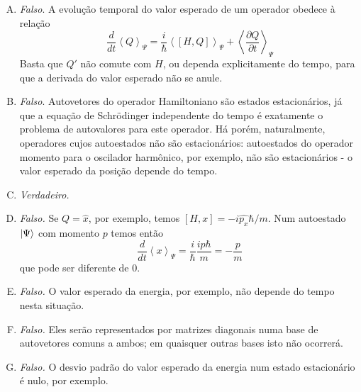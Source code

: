 \documentclass[a4paper, 12pt, notitlepage]{article}
\begin{document}
\begin{enumerate}
\begin{enumerate}[(A)]
  \item \textit{Falso}. A evolução temporal do valor esperado de um operador obedece à relação
  \[ \frac{d}{dt} \left\langle Q \right\rangle_\Psi = \frac{i}{\hbar}\left\langle [H, Q]\right\rangle_\Psi + \left\langle \frac{\partial Q}{\partial t}\right\rangle_\Psi\]
  Basta que $Q'$ não comute com $H$, ou dependa explicitamente do tempo, para que a derivada do valor esperado não se anule.
  \item \textit{Falso}. Autovetores do operador Hamiltoniano são estados estacionários, já que a equação de Schrödinger independente do tempo é exatamente o problema de autovalores para este operador. Há porém, naturalmente, operadores cujos autoestados não são estacionários: autoestados do operador momento para o oscilador harmônico, por exemplo, não são estacionários - o valor esperado da posição depende do tempo.
  \item \textit{Verdadeiro.}
  \item \textit{Falso.} Se $Q = \hat{x}$, por exemplo, temos $[H, x] = -i\hat{p_x}\hbar/m$. Num autoestado $\ket{\Psi}$ com momento $p$ temos então
  \[ \frac{d}{dt} \left\langle x \right\rangle_\Psi = \frac{i}{\hbar} \frac{ip\hbar}{m} = -\frac{p}{m} \]
  \noindent que pode ser diferente de $0$. 
  \item \textit{Falso.} O valor esperado da energia, por exemplo, não depende do tempo nesta situação.
  \item \textit{Falso.} Eles serão representados por matrizes diagonais numa base de autovetores comuns a ambos; em quaisquer outras bases isto não ocorrerá.
  \item \textit{Falso.} O desvio padrão do valor esperado da energia num estado estacionário é nulo, por exemplo.
  
\end{enumerate}

\end{enumerate}
\end{document}
